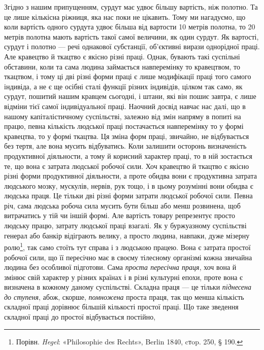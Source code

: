 Згідно з нашим припущенням, сурдут має удвоє більшу вартість,
ніж полотно. Та це лише кількісна ріжниця, яка нас поки
не цікавить. Тому ми нагадуємо, що коли вартість одного
сурдута удвоє більша від вартости 10 метрів полотна, то 20 метрів
полотна мають вартість такої самої величини, як один сурдут. Як
вартості, сурдут і полотно — речі однакової субстанції, об’єктивні
вирази однорідної праці. Але кравецтво й ткацтво є якісно
різні праці. Однак, бувають такі суспільні обставини, коли та
сама людина займається навперемінку то кравецтвом, то ткацтвом,
і тому ці дві різні форми праці є лише модифікації праці
того самого індивіда, а не є ще осібні сталі функції різних індивідів,
цілком так само, як сурдут, пошитий нашим кравцем сьогодні,
і штани, які він пошиє завтра, є лише відміни тієї самої
індивідуальної праці. Наочний досвід навчає нас далі, що в нашому
капіталістичному суспільстві, залежно від змін напряму
в попиті на працю, певна кількість людської праці постачається
навперемінку то у формі кравецтва, то у формі ткацтва. Ця зміна
форм праці, звичайно, не відбувається без тертя, але вона мусить
відбуватись. Коли залишити осторонь визначеність продуктивної
діяльности, а тому й корисний характер праці, то в ній зостається
те, що вона є затрата людської робочої сили. Хоч кравецтво й
ткацтво є якісно різні форми продуктивної діяльности, а проте
обидва вони є продуктивна затрата людського мозку, мускулів,
нервів, рук тощо, і в цьому розумінні вони обидва є людська праця.
Це тільки дві різні форми затрати людської робочої сили. Певна
річ, сама людська робоча сила мусить бути більш або менш розвинена,
щоб витрачатись у тій чи іншій формі. Але вартість товару
репрезентує просто людську працю, затрату людської праці
взагалі. Як у буржуазному суспільстві генерал або банкір відіграють
велику, а просто людина, навпаки, дуже мізерну ролю\footnote{
Порівн. \emph{Hegel}: «Philosophie des Rechts», Berlin 1840, cтop. 250,
§ 190.
},
так само стоїть тут справа і з людською працею. Вона є затрата
простої робочої сили, що її пересічно має в своєму тілесному
організмі кожна звичайна людина без особливої підготови. Сама
\emph{проста пересічна праця}, хоч вона й змінює свій характер у різних
країнах і в різні культурні епохи, проте вона є визначена в кожному
даному суспільстві. Складна праця — це тільки \emph{піднесена
до ступеня}, абож, скорше, \emph{помножена} проста праця, так що менша
кількість складної праці дорівнює більшій кількості простої праці.
Що таке зведення складної праці до простої відбувається постійно,
